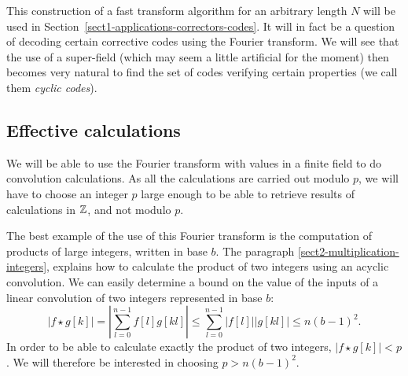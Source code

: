  
This construction of a fast transform algorithm for an arbitrary length $ N $ will be used in Section~\ref{sect1-applications-correctors-codes}. It will in fact be a question of decoding certain corrective codes using the Fourier transform. We will see that the use of a super-field (which may seem a little artificial for the moment) then becomes very natural to find the set of codes verifying certain properties (we call them \textit{cyclic codes}).

\subsection{Effective calculations}
\label{sect2-effective-calculations}
 
 
We will be able to use the Fourier transform with values in a finite field to do convolution calculations. As all the calculations are carried out modulo $ p $, we will have to choose an integer $ p $ large enough to be able to retrieve results of calculations in $ \mathbb{Z} $, and not modulo $ p $.
 
 
The best example of the use of this Fourier transform is the computation of products of large integers, written in base $ b $. The paragraph \ref{sect2-multiplication-integers}, explains how to calculate the product of two integers using an acyclic convolution. We can easily determine a bound on the value of the inputs of a linear convolution of two integers represented in base $ b $:
\begin{equation*}
| f \star g [k] | = \left| \sum_{l = 0}^{n-1}{f [l] g [kl]} \right| \leq \sum_{l = 0}^{n-1}{| f [l] | | g [kl] |} \leq n (b-1)^2.
\end{equation*}
In order to be able to calculate exactly the product of two integers, $ | f \star g [k] | <p $. We will therefore be interested in choosing $ p> n (b-1)^2 $.
 
